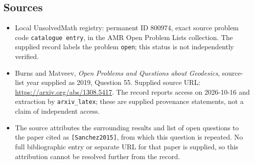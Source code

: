 \documentclass[11pt]{article}
\begin{document}
\subsection{Sources}
\begin{itemize}
\item Local UnsolvedMath registry: permanent ID \(800974\), exact source problem code \texttt{catalogue entry}, in the AMR Open Problem Lists collection. The supplied record labels the problem \texttt{open}; this status is not independently verified.
\item Burns and Matveev, \emph{Open Problems and Questions about Geodesics}, source-list year supplied as 2019, Question 55. Supplied source URL: \url{https://arxiv.org/abs/1308.5417}. The record reports access on 2026-10-16 and extraction by \texttt{arxiv\_latex}; these are supplied provenance statements, not a claim of independent access.
\item The source attributes the surrounding results and list of open questions to the paper cited as \texttt{[Sanchez2015]}, from which this question is repeated. No full bibliographic entry or separate URL for that paper is supplied, so this attribution cannot be resolved further from the record.
\end{itemize}
\end{document}
